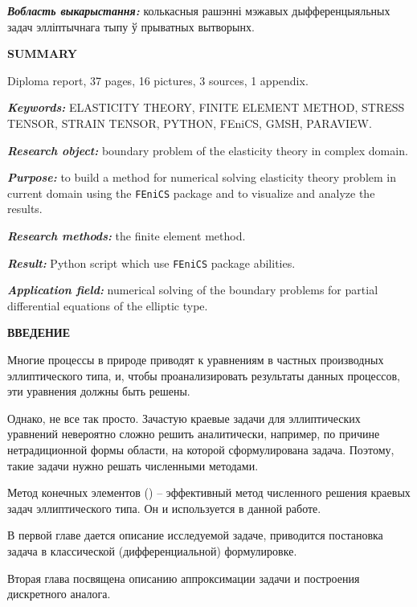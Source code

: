 \documentclass[a4paper, 14pt]{extreport}
\begin{document}
\textbf{\textit{Вобласть выкарыстання:}} колькасныя рашэнні мэжавых 
дыфференцыяльных задач элліптычнага тыпу ў прыватных вытворынх.


\begin{center}
	\Large{\textbf{SUMMARY}}
\end{center}

Diploma report, 37 pages, 16 pictures, 3 sources, 1 appendix.

\textbf{\textit{Keywords:}} ELASTICITY THEORY, FINITE ELEMENT METHOD,
STRESS TENSOR,  STRAIN TENSOR, PYTHON, FEniCS, GMSH, 
PARAVIEW.

\textbf{\textit{Research object:}} boundary problem of the elasticity
theory in complex domain.

\textbf{\textit{Purpose:}} to build a method for numerical solving 
elasticity theory problem in current domain using the \texttt{FEniCS}
package and to visualize and analyze the results.

\textbf{\textit{Research methods:}} the finite element method.

\textbf{\textit{Result:}} Python script which use \texttt{FEniCS}
package abilities.

\textbf{\textit{Application field:}} numerical solving of the
boundary problems for partial differential equations of the elliptic type.


\newpage
{}
\begin{center}
	\Large{\textbf{ВВЕДЕНИЕ}}
\end{center}

Многие процессы в природе приводят к уравнениям в частных производных
эллиптического типа, и, чтобы проанализировать результаты данных процессов,
эти уравнения должны быть решены.

Однако, не все так просто. Зачастую краевые задачи для эллиптических
уравнений невероятно сложно решить аналитически, например, по причине
нетрадиционной формы области, на которой сформулирована задача.
Поэтому, такие задачи нужно решать численными методами.

Метод конечных элементов (\cite{finite_element_method}) -- эффективный метод численного решения краевых задач
эллиптического типа. Он и используется в данной работе.

В первой главе дается описание исследуемой задаче, 
приводится постановка задача в классической 
(дифференциальной) формулировке.

Вторая глава посвящена описанию аппроксимации задачи 
и построения дискретного аналога.
\end{document}
